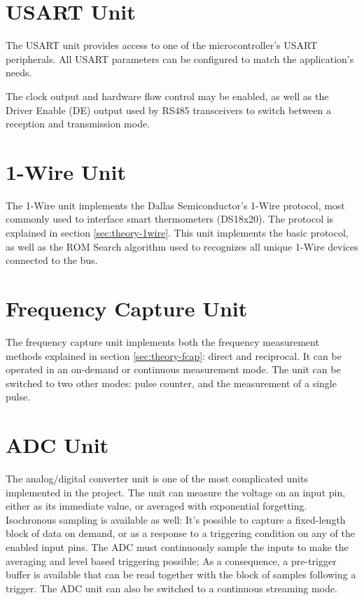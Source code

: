 \section{USART Unit}

The USART unit provides access to one of the microcontroller's USART peripherals. All USART parameters can be configured to match the application's needs. 

The clock output and hardware flow control may be enabled, as well as the Driver Enable (DE) output used by RS485 transceivers to switch between a reception and transmission mode.


\section{1-Wire Unit}

The 1-Wire unit implements the Dallas Semiconductor's 1-Wire protocol, most commonly used to interface smart thermometers (DS18x20). The protocol is explained in section \ref{sec:theory-1wire}. This unit implements the basic protocol, as well as the ROM Search algorithm used to recognizes all unique 1-Wire devices connected to the bus.


\section{Frequency Capture Unit}

The frequency capture unit implements both the frequency measurement methods explained in section \ref{sec:theory-fcap}: direct and reciprocal. It can be operated in an on-demand or continuous measurement mode. The unit can be switched to two other modes: pulse counter, and the measurement of a single pulse.


\section{ADC Unit}

The analog/digital converter unit is one of the most complicated units implemented in the project. The unit can measure the voltage on an input pin, either as its immediate value, or averaged with exponential forgetting. Isochronous sampling is available as well: It's possible to capture a fixed-length block of data on demand, or as a response to a triggering condition on any of the enabled input pins. The ADC must continuously sample the inputs to make the averaging and level based triggering possible; As a consequence, a pre-trigger buffer is available that can be read together with the block of samples following a trigger. The ADC unit can also be switched to a continuous streaming mode.

